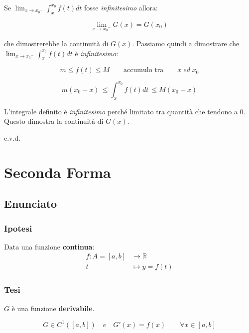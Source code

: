 \documentclass[../dimostrazioni]{subfiles}
\begin{document}
                    Se \( \lim_{x \to {x_0}^{-}} \int_{x}^{x_0} f(t) dt \) fosse \emph{infinitesimo} allora:

                    \[  \lim_{x \to {x_0}^{-}}G(x) = G(x_0) \]

                    che dimostrerebbe la continuità di \(G(x)\). Passiamo quindi a dimostrare che \( \lim_{x \to {x_0}^{-}} \int_{x}^{x_0} f(t) dt \) è \emph{infinitesimo}:

                    \[m \leqslant f(t) \leqslant M \qquad \text {accumulo tra} \qquad x \; ed \; x_0 \]

                    \[m(x_0-x) \, \leqslant \int_{x}^{x_0} f(t) dt \, \leqslant M(x_0-x) \]

                    L'integrale definito è \emph{infinitesimo} perché limitato tra quantità che tendono a 0. Questo dimostra la continuità di \(G(x)\).

                    c.v.d.
            
            \section*{Seconda Forma}

                \subsection*{Enunciato}

                    \subsubsection*{Ipotesi}

                        Data una funzione \textbf{continua}:
                        \begin{align*}
                            f : A = [a, b] &\longrightarrow \mathbb{R}\\
                            t &\longmapsto y = f(t) 
                        \end{align*}

                    \subsubsection*{Tesi}
                    
                        \(G\) è una funzione \textbf{derivabile}.

                        \[G \in C^{1}([a, b]) \quad e \quad G'(x) = f(x) \qquad \forall x \in [a,b] \]
        
\end{document}
